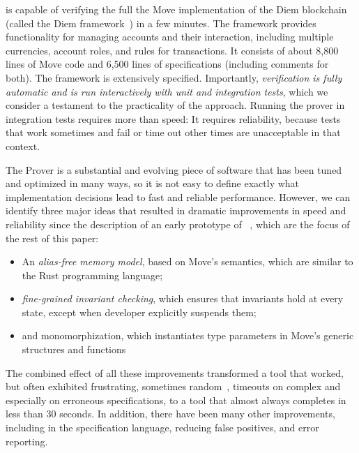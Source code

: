 
\MVP is capable of verifying the full
the Move implementation of the Diem
blockchain~\cite{DIEM} (called the Diem framework~\cite{DIEM_FRAMEWORK})
in a few minutes.
The framework provides functionality for managing
accounts and their interaction, including multiple currencies, account roles,
and rules for transactions.  It consists of
about 8,800 lines of Move code and 6,500 lines of specifications (including comments for both).
The framework is %
extensively specified.
Importantly,
\emph{verification is fully automatic and is run interactively with unit and integration
  tests},
which we consider a testament to the practicality of the approach.
Running the prover in integration tests requires more than speed: It requires
reliability, because tests that work sometimes and fail or time out other
times are unacceptable in that context.

The Prover is a substantial and evolving piece of software that has
been tuned and optimized in many ways, so it is not easy to define
exactly what implementation decisions lead to fast and reliable
performance.  However, we can identify three major ideas that
resulted in dramatic improvements in speed and reliability since the
description of an early prototype of \MVP~\cite{MOVE_PROVER},
which are the focus of the rest of this paper:
\begin{itemize}
\item An \emph{alias-free memory model}, based on Move's semantics, which are similar to the Rust programming language;
\item \emph{fine-grained invariant checking}, which ensures that invariants hold at every state, except when developer explicitly suspends them;
\item and monomorphization, which instantiates type parameters in Move's generic
  structures and functions
\end{itemize}
The combined effect of all these improvements transformed a tool that worked, but
often exhibited frustrating, sometimes random~\cite{BUTTERFLY},
timeouts on complex and especially
on erroneous specifications, to a tool that almost always completes in less than 30 seconds.
In addition, there have been many other improvements, including in the specification language,
reducing false positives, and error reporting.

